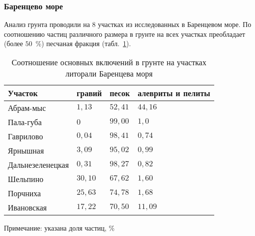             \subsubsection{Баренцево море}
Анализ грунта проводили на 8 участках из исследованных в Баренцевом море.
По соотношению частиц различного размера в грунте на всех участках преобладает (более $50$~\%) песчаная фракция (табл.~\ref{tab:grunt_general_Barents}). 
    \begin{table}[ht]
    \caption{Соотношение основных включений в грунте на участках литорали Баренцева моря}
    \label{tab:grunt_general_Barents}
    \begin{tabularx}{\textwidth}{|*{4}{X|}} \hline
    Участок  &  гравий &  песок &  алевриты и пелиты 
        \\ \hline
    Абрам-мыс &  $1,13$ & $52,41$ & $44,16$
        \\ \hline
    Пала-губа &   $0$ &  $99,00$ &  $1,0$
        \\ \hline
    Гаврилово &  $0,04$ & $98,41$ &  $0,74$
        \\ \hline
    Ярнышная &   $3,09$ & $95,02$ & $0,99$
        \\ \hline
    Дальнезеленецкая &  $0,31$ & $98,27$ & $0,82$
        \\ \hline
    Шельпино &  $30,10$ & $67,62$ & $1,60$
        \\ \hline
    Порчниха & $25,63$ & $74,78$ & $1,68$
        \\ \hline
    Ивановская  & $17,22$ & $70,50$ & $11,09$
        \\ \hline
    \end{tabularx}

    {\footnotesize Примечание: указана доля частиц, \%}
    \end{table}


